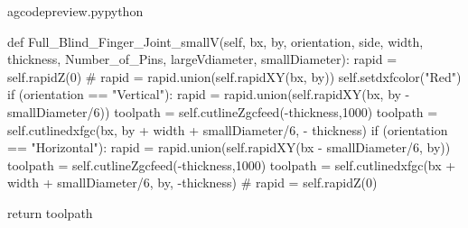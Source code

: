 \documentclass{ltxdoc}
\begin{document}
\begin{writecode}{a}{gcodepreview.py}{python}
            
    def Full_Blind_Finger_Joint_smallV(self, bx, by, orientation, side, width, thickness, Number_of_Pins, largeVdiameter, smallDiameter):
        rapid = self.rapidZ(0)
    #    rapid = rapid.union(self.rapidXY(bx, by))
        self.setdxfcolor("Red")
        if (orientation == "Vertical"):
            rapid = rapid.union(self.rapidXY(bx, by - smallDiameter/6))
            toolpath = self.cutlineZgcfeed(-thickness,1000)
            toolpath = self.cutlinedxfgc(bx, by + width + smallDiameter/6, - thickness)
        if (orientation == "Horizontal"):
            rapid = rapid.union(self.rapidXY(bx - smallDiameter/6, by))
            toolpath = self.cutlineZgcfeed(-thickness,1000)
            toolpath = self.cutlinedxfgc(bx + width + smallDiameter/6, by, -thickness)
    #        rapid = self.rapidZ(0)

        return toolpath


\end{writecode}
\end{document}
